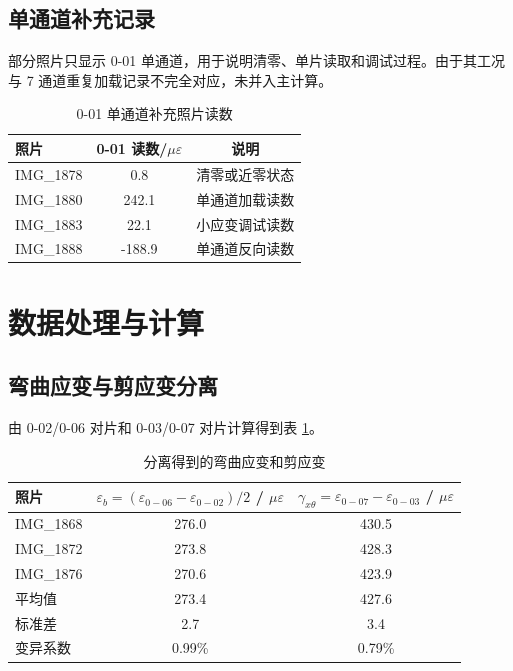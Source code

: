 \documentclass[UTF8,a4paper,10pt]{ctexart}
\newcommand{\ue}{\mu\varepsilon}
\begin{document}
\subsection{单通道补充记录}

部分照片只显示 0-01 单通道，用于说明清零、单片读取和调试过程。由于其工况与 7 通道重复加载记录不完全对应，未并入主计算。

\begin{table}[H]
    \centering
    \caption{0-01 单通道补充照片读数}
    \begin{tabular}{lcc}
        \toprule
        照片 & 0-01 读数/$\ue$ & 说明 \\
        \midrule
        IMG\_1878 & 0.8 & 清零或近零状态 \\
        IMG\_1880 & 242.1 & 单通道加载读数 \\
        IMG\_1883 & 22.1 & 小应变调试读数 \\
        IMG\_1888 & -188.9 & 单通道反向读数 \\
        \bottomrule
    \end{tabular}
\end{table}

\section{数据处理与计算}

\subsection{弯曲应变与剪应变分离}

由 0-02/0-06 对片和 0-03/0-07 对片计算得到表 \ref{tab:derived-strain}。

\begin{table}[H]
    \centering
    \caption{分离得到的弯曲应变和剪应变}
    \label{tab:derived-strain}
    \begin{tabular}{lcc}
        \toprule
        照片 & $\varepsilon_b=(\varepsilon_{0-06}-\varepsilon_{0-02})/2$ / $\ue$
             & $\gamma_{x\theta}=\varepsilon_{0-07}-\varepsilon_{0-03}$ / $\ue$ \\
        \midrule
        IMG\_1868 & 276.0 & 430.5 \\
        IMG\_1872 & 273.8 & 428.3 \\
        IMG\_1876 & 270.6 & 423.9 \\
        \midrule
        平均值 & 273.4 & 427.6 \\
        标准差 & 2.7 & 3.4 \\
        变异系数 & 0.99\% & 0.79\% \\
        \bottomrule
    \end{tabular}
\end{table}
\end{document}
